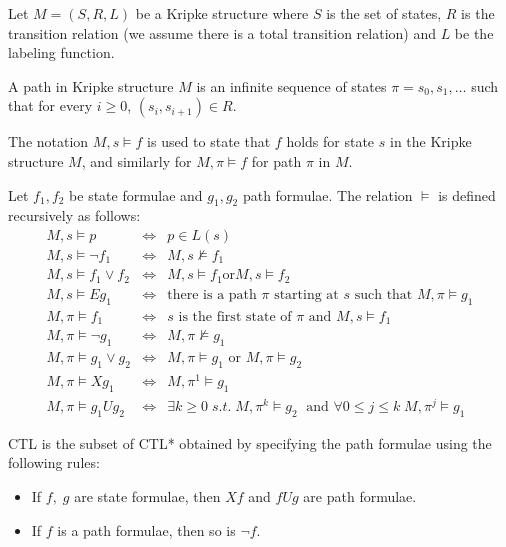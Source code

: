 \documentclass[11pt]{article}
\begin{document}
    Let $M = (S,R,L)$ be a Kripke structure where $S$ is the set of states, $R$
    is the transition relation (we assume there is a total transition relation)
    and $L$ be the labeling function.

    \begin{definition}
        A path in Kripke structure $M$ is an infinite sequence of states 
        $\pi = s_0,s_1,\dots$ such that for every $i\geq 0$, 
        $(s_i, s_{i+1})\in R$.
    \end{definition}

    The notation $M, s \models f$ is used to state that $f$ holds for state
    $s$ in the Kripke structure $M$, and similarly for $M, \pi \models f$ for
    path $\pi$ in $M$.

    \begin{definition}
        Let $f_1, f_2$ be state formulae and $g_1, g_2$ path formulae. 
        The relation $\models$ is defined recursively as follows:
        \begin{eqnarray}
            M,s \models p &\iff & p\in L(s) \\
            M,s \models \neg f_1 &\iff &M,s \not\models f_1 \\
            M,s \models f_1 \vee f_2 &\iff & M,s \models f_1 \text{or} M,s \models f_2 \\
            M,s \models Eg_1 &\iff &\text{there is a path $\pi$ starting at $s$ such
            that $M, \pi \models g_1$}\\
            M, \pi \models f_1 &\iff & s \text{ is the first state of $\pi$ and }
            M,s \models f_1 \\
            M, \pi \models \neg g_1 &\iff &M,\pi \not\models g_1\\
            M,\pi \models g_1 \vee g_2 &\iff & M,\pi \models g_1 \text{ or } M,\pi \models g_2 \\
            M, \pi \models Xg_1 &\iff &M,\pi^1 \models g_1\\
            M,\pi \models g_1Ug_2 &\iff &\exists k\geq 0\; s.t.\; M,\pi^k\models g_2\;
            \text{ and } \forall 0\leq j\leq k\; M,\pi^j \models g_1
        \end{eqnarray}
    \end{definition}

    \begin{definition}
        CTL is the subset of CTL* obtained by specifying the path formulae using
        the following rules\cite{ltl}:
        \begin{itemize}
            \item
                If $f,\;g$ are state formulae, then $Xf$ and $fUg$ are path
                formulae.
            \item
                If $f$ is a path formulae, then so is $\neg f$.
        \end{itemize}
    \end{definition}
\end{document}
